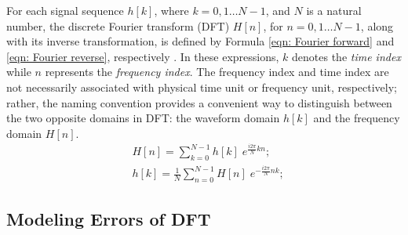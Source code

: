 \documentclass[twoside]{article}
\numberwithin{equation}{section}
\begin{document}
For each signal sequence $h[k]$, where $k = 0, 1 \dots  N-1$, and $N$ is a natural number, the discrete Fourier transform (DFT) $H[n]$, for $n = 0, 1 \dots  N-1$, along with its inverse transformation, is defined by Formula \eqref{eqn: Fourier forward} and \eqref{eqn: Fourier reverse}, respectively \cite{Numerical_Recipes}.
In these expressions, $k$ denotes the \emph{time index} while $n$ represents the \emph{frequency index}.
The frequency index and time index are not necessarily associated with physical time unit or frequency unit, respectively; rather, the naming convention provides a convenient way to distinguish between the two opposite domains in DFT: the waveform domain $h[k]$ and the frequency domain $H[n]$.
\begin{align}
\label{eqn: Fourier forward}
& H[n]=\sum_{k=0}^{N-1} h[k] \; e^{\frac{i 2\pi}{N} k n}; \\
\label{eqn: Fourier reverse}
& h[k]=\frac{1}{N} \sum_{n=0}^{N-1} H[n] \; e^{-\frac{i 2\pi}{N} n k};
\end{align}




\subsection{Modeling Errors of DFT}

\end{document}

